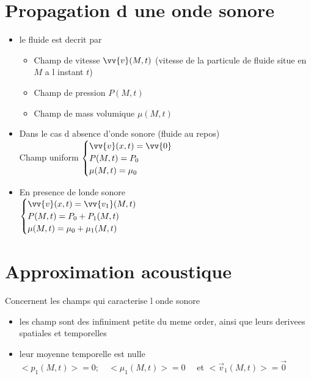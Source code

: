 \documentclass[12pt]{book}
\begin{document}
        \section{Propagation d une onde sonore}
            \begin{itemize}
                \item le fluide est decrit par \\
                    \begin{itemize}
                        \item Champ de vitesse $\vv{v}(M,t)$ (vitesse de la particule de fluide situe en $M$ a l instant $t$)
                        \item Champ de pression $P(M,t)$
                        \item Champ de mass volumique $\mu (M,t) $
                    \end{itemize}
                \item Dans le cas d absence d'onde sonore (fluide au repos) \\
                    Champ uniform $\begin{cases}
                        \vv{v}(x,t)=\vv{0} \\
                        P(M,t)=P_0 \\
                        \mu(M,t)=\mu_0
                    \end{cases}$
                \item En presence de londe sonore \\
                    $\begin{cases}
                        \vv{v}(x,t)=\vv{v_1}(M,t) \\
                        P(M,t)=P_0+P_1(M,t) \\
                        \mu(M,t)=\mu_0+\mu_1(M,t)
                    \end{cases}$
            \end{itemize}
        \section{Approximation acoustique}
            Concernent les champs qui caracterise l onde sonore 
            \begin{itemize}
                \item les champ sont des infiniment petite du meme order, ainsi que leurs derivees spatiales et temporelles
                \item leur moyenne temporelle est nulle \\
                $<p_{1}(M, t)>=0 ; \quad<\mu_{1}(M, t)>=0 \quad$ et $<\vec{v}_{1}(M, t)>=\overrightarrow{0}$
            \end{itemize}
\end{document}
